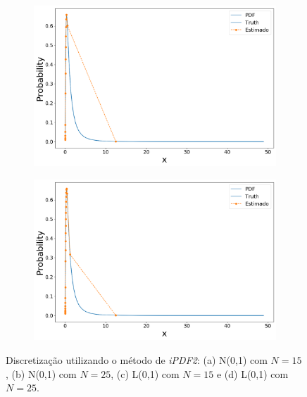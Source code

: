 \begin{figure}[H]
	\begin{subfigure}[b]{0.45\textwidth}
		\centering 
		\includegraphics[width=\linewidth]{./figuras/iPDF2_lognormal_15}
		\caption{}
		\label{fig:ipdf2lognorm15}
	\end{subfigure}
	\hfill
	\begin{subfigure}[b]{0.45\textwidth}
		\centering 
		\includegraphics[width=\linewidth]{./figuras/iPDF2_lognormal_25}
		\caption{}
		\label{fig:ipdf2lognorm25}
	\end{subfigure}
	
	\caption{Discretização utilizando o método de \textit{iPDF2}: (a) N(0,1) com $N = 15$, (b) N(0,1) com $N = 25$, (c) L(0,1) com $N = 15$ e (d) L(0,1) com $N = 25$.}
	\label{fig:ipdf2norm}
\end{figure}


%

